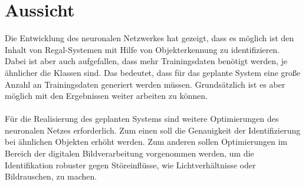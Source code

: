 \documentclass[a4paper,12pt,oneside]{article}
\begin{document}
\newpage

\section{Aussicht}
Die Entwicklung des neuronalen Netzwerkes hat gezeigt, dass es möglich ist den Inhalt von Regal-Systemen mit Hilfe von Objekterkennung zu identifizieren. Dabei ist aber auch aufgefallen, dass mehr Trainingsdaten benötigt werden, je ähnlicher die Klassen sind. Das bedeutet, dass für das geplante System eine große Anzahl an Trainingsdaten generiert werden müssen. Grundsätzlich ist es aber möglich mit den Ergebnissen weiter arbeiten zu können.\\
\\
Für die Realisierung des geplanten Systems sind weitere Optimierungen des neuronalen Netzes erforderlich. Zum einen soll die Genauigkeit der Identifizierung bei ähnlichen Objekten erhöht werden. Zum anderen sollen Optimierungen im Bereich der digitalen Bildverarbeitung vorgenommen werden, um die Identifikation robuster gegen Störeinflüsse, wie Lichtverhältnisse oder Bildrauschen, zu machen. 

\newpage

\printbibliography
  
\end{document}
